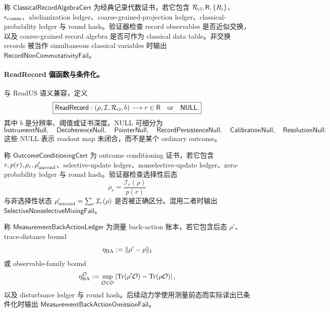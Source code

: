 \begin{definition}[经典记录代数证书]\label{def:typed-address-biaxial-completion-classical-record-algebra-cert}
称 \(\mathsf{ClassicalRecordAlgebraCert}\) 为经典记录代数证书，若它包含 \(\mathcal R_{\rm cl},\mathsf R,\{R_i\}\)、\(\epsilon_{\rm comm}\)、abelianization ledger、coarse-grained-projection ledger、classical-probability ledger 与 round hash。验证器检查 record observables 是否近似交换，以及 coarse-grained record algebra 是否可作为 classical data table。非交换 records 被当作 simultaneous classical variables 时输出 \(\mathsf{RecordNonCommutativityFail}\)。
\end{definition}

\paragraph{ReadRecord 偏函数与条件化。}
与 ReadUS 语义兼容，定义
\[
\boxed{
\mathsf{ReadRecord}:
(\rho,\mathcal I,\mathcal R_{\rm cl},b)
\longrightarrow
r\in\mathsf R
\quad\text{or}\quad
\mathsf{NULL}.
}
\]
其中 \(b\) 是分辨率、阈值或证书深度。NULL 可细分为
\[
\mathsf{InstrumentNull},\quad
\mathsf{DecoherenceNull},\quad
\mathsf{PointerNull},\quad
\mathsf{RecordPersistenceNull},\quad
\mathsf{CalibrationNull},\quad
\mathsf{ResolutionNull}.
\]
这些 NULL 表示 readout map 未闭合，而不是某个 ordinary outcome。

\begin{definition}\label{def:typed-address-biaxial-completion-outcome-conditioning-cert}
称 \(\mathsf{OutcomeConditioningCert}\) 为 outcome conditioning 证书，若它包含 \(r,p(r),\rho_r,\rho'_{\rm uncond}\)、selective-update ledger、nonselective-update ledger、zero-probability ledger 与 round hash。验证器检查选择性后态
\[
\rho_r=\frac{\mathcal I_r(\rho)}{p(r)}
\]
与非选择性状态 \(\rho'_{\rm uncond}=\sum_r\mathcal I_r(\rho)\) 是否被正确区分。混用二者时输出 \(\mathsf{SelectiveNonselectiveMixingFail}\)。
\end{definition}

\begin{definition}\label{def:typed-address-biaxial-completion-measurement-back-action-ledger}
称 \(\mathsf{MeasurementBackActionLedger}\) 为测量 back-action 账本，若它包含后态 \(\rho'\)、trace-distance bound
\[
\eta_{\rm BA}:=\|\rho'-\rho\|_1
\]
或 observable-family bound
\[
\eta_{\rm BA}^{\mathcal O}
:=
\sup_{\mathcal O\in\mathfrak O}
\left|
{\rm Tr}(\rho'\mathcal O)-{\rm Tr}(\rho\mathcal O)
\right|,
\]
以及 disturbance ledger 与 round hash。后续动力学使用测量前态而实际读出已条件化时输出 \(\mathsf{MeasurementBackActionOmissionFail}\)。
\end{definition}

